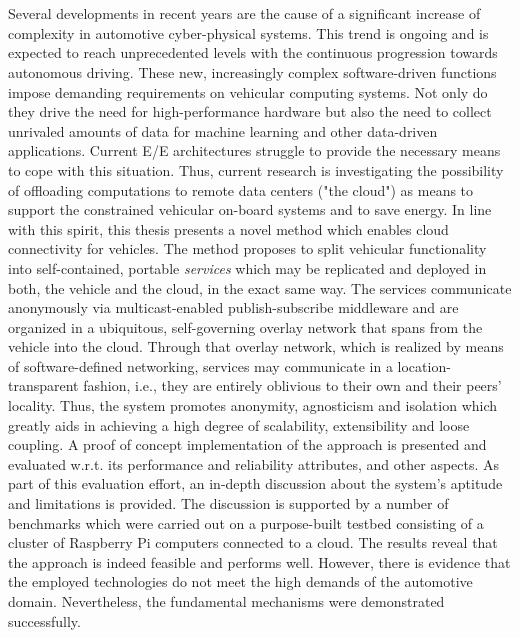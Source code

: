 \chapter{\abstractname}
Several developments in recent years are the cause of a significant increase of complexity in automotive cyber-physical systems. This trend is ongoing and is expected to reach unprecedented levels with the continuous progression towards autonomous driving. These new, increasingly complex software-driven functions impose demanding requirements on vehicular computing systems. Not only do they drive the need for high-performance hardware but also the need to collect unrivaled amounts of data for machine learning and other data-driven applications. Current E/E architectures struggle to provide the necessary means to cope with this situation. Thus, current research is investigating the possibility of offloading computations to remote data centers ("the cloud") as means to support the constrained vehicular on-board systems and to save energy. 
In line with this spirit, this thesis presents a novel method which enables cloud connectivity for vehicles.
The method proposes to split vehicular functionality into self-contained, portable \emph{services} which may be replicated and deployed in both, the vehicle and the cloud, in the exact same way. The services communicate anonymously via multicast-enabled publish-subscribe middleware and are organized in a ubiquitous, self-governing overlay network that spans from the vehicle into the cloud. Through that overlay network, which is realized by means of software-defined networking, services may communicate in a location-transparent fashion, i.e., they are entirely oblivious to their own and their peers' locality. 
Thus, the system promotes anonymity, agnosticism and isolation which greatly aids in achieving a high degree of scalability, extensibility and loose coupling. 
A proof of concept implementation of the approach is presented and evaluated w.r.t. its performance and reliability attributes, and other aspects. 
As part of this evaluation effort, an in-depth discussion about the system's aptitude and limitations is provided. The discussion is supported by a number of benchmarks which were carried out on a purpose-built testbed consisting of a cluster of Raspberry Pi computers connected to a cloud. The results reveal that the approach is indeed feasible and performs well. However, there is evidence that the employed technologies do not meet the high demands of the automotive domain. Nevertheless, the fundamental mechanisms were demonstrated successfully. 
